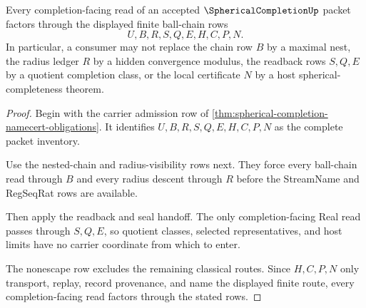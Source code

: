 \begin{theorem}
\label{thm:spherical-completion-ball-chain-nonescape}
Every completion-facing read of an accepted $\SphericalCompletionUp$ packet factors through the displayed finite ball-chain rows
$$
U,B,R,S,Q,E,H,C,P,N .
$$
In particular, a consumer may not replace the chain row $B$ by a maximal nest, the radius ledger $R$ by a hidden convergence modulus, the readback rows $S,Q,E$ by a quotient completion class, or the local certificate $N$ by a host spherical-completeness theorem.
\end{theorem}
\begin{proof}
Begin with the carrier admission row of \autoref{thm:spherical-completion-namecert-obligations}. It identifies $U,B,R,S,Q,E,H,C,P,N$ as the complete packet inventory.

Use the nested-chain and radius-visibility rows next. They force every ball-chain read through $B$ and every radius descent through $R$ before the StreamName and RegSeqRat rows are available.

Then apply the readback and seal handoff. The only completion-facing Real read passes through $S,Q,E$, so quotient classes, selected representatives, and host limits have no carrier coordinate from which to enter.

The nonescape row excludes the remaining classical routes. Since $H,C,P,N$ only transport, replay, record provenance, and name the displayed finite route, every completion-facing read factors through the stated rows.
\end{proof}



